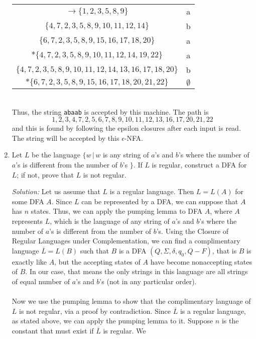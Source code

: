 \documentclass[]{article}
\begin{document}
\begin{enumerate}
\begin{tabular}{c|c}
        $ \rightarrow \{1,2,3,5,8,9\}$                 & a           \\
        $ \{4,7,2,3,5,8,9,10,11,12,14\}$               & b           \\
        $ \{6,7,2,3,5,8,9,15,16,17,18,20\}$            & a           \\
        $*\{4,7,2,3,5,8,9,10,11,12,14,19,22\}$         & a           \\       
        $\{4,7,2,3,5,8,9,10,11,12,14,13,16,17,18,20\}$ & b           \\
        $*\{6,7,2,3,5,8,9,15,16,17,18,20,21,22\}$     & $\emptyset$ \\
      \end{tabular} \\
     Thus, the string \texttt{abaab} is accepted by this machine. The path is
        \[
           1, 2, 3, 4, 7, 2, 5, 6, 7, 8, 9, 10, 11, 12, 13, 16, 17, 20, 21, 22
        \]
    and this is found by following the epsilon closures after each input
    is read. The string will be accepted by this $\epsilon$-NFA.
    \item Let $L$ be the language $\{ w \, | \, w$ is any string of $a$'s and
    $b$'s where the number of $a$'s is different from the number of $b$'s $\}$.
    If $L$ is regular, construct a DFA for $L$; if not, prove that $L$ is not
    regular.
    \item[\emph{Solution:}] Let us assume that $L$ is a regular language. Then 
    $L = L(A)$ for some DFA $A$. Since $L$ can be represented by a DFA, we can
    suppose that $A$ has $n$ states. Thus, we can apply the pumping lemma to DFA
    $A$, where $A$ represents $L$, which is the language of any string of $a$'s
    and $b$'s where the number of $a$'s is different from the number of $b$'s. 
    Using the Closure of Regular Languages under Complementation, we can find a
    complimentary language $\overline{L} = L(B)$ such that $B$ is a DFA $(Q, 
    \Sigma, \delta, q_0, Q-F)$, that is $B$ is exactly like $A$, but the 
    accepting states of $A$ have become nonaccepting states of $B$. In our case,
    that means the only strings in this language are all strings of equal number
    of $a$'s and $b$'s (not in any particular order). \\ \\
    Now we use the pumping lemma to show that the complimentary language
    of $L$ is not regular, via a proof by contradiction. Since $\overline{L}$ is
    a regular language, as stated above, we can apply the pumping lemma to it.
    Suppose $n$ is the constant that must exist if $\overline{L}$ is regular. We

\end{enumerate}
\end{document}
